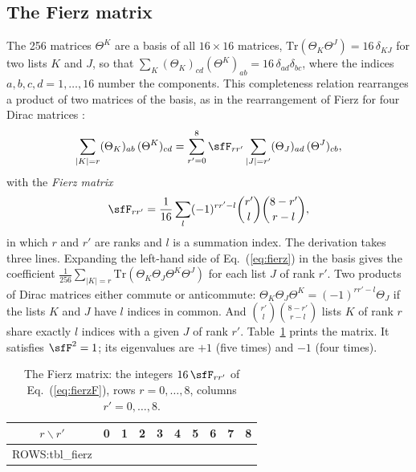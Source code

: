 \subsection{The Fierz matrix}

The 256 matrices $\Theta^{K}$ are a basis of all $16\times16$ matrices,
$\mathrm{Tr}(\Theta_K\Theta^{J})=16\,\delta_{KJ}$ for two lists $K$ and $J$, so that
$\sum_K(\Theta_K)_{cd}(\Theta^{K})_{ab}=16\,\delta_{ad}\delta_{bc}$, where the indices
$a,b,c,d=1,\dots,16$ number the components. This completeness relation rearranges a product of two
matrices of the basis, as in the rearrangement of Fierz for four Dirac matrices \cite{Fierz1937}:
\begin{equation}
\sum_{|K|=r}(\Theta_K)_{ab}\,(\Theta^{K})_{cd}=\sum_{r'=0}^{8}\sfF_{rr'}\sum_{|J|=r'}(\Theta_J)_{ad}\,(\Theta^{J})_{cb},
\label{eq:fierz}
\end{equation}
with the \emph{Fierz matrix}
\begin{equation}
\sfF_{rr'}=\frac1{16}\sum_{l}(-1)^{rr'-l}\binom{r'}{l}\binom{8-r'}{r-l} ,
\label{eq:fierzF}
\end{equation}
in which $r$ and $r'$ are ranks and $l$ is a summation index. The derivation takes three lines.
Expanding the left-hand side of Eq.~(\ref{eq:fierz}) in the basis gives the coefficient
$\tfrac1{256}\sum_{|K|=r}\mathrm{Tr}(\Theta_K\Theta_J\Theta^{K}\Theta^{J})$ for each list $J$ of rank
$r'$. Two products of Dirac matrices either commute or anticommute:
$\Theta_K\Theta_J\Theta^{K}=(-1)^{rr'-l}\Theta_J$ if the lists $K$ and $J$ have $l$ indices in common.
And $\binom{r'}{l}\binom{8-r'}{r-l}$ lists $K$ of rank $r$ share exactly $l$ indices with a given $J$
of rank $r'$. Table~\ref{tab:fierz} prints the matrix. It satisfies $\sfF^{2}=1$; its eigenvalues are
$+1$ (five times) and $-1$ (four times).

\begin{table}
\caption{\label{tab:fierz}The Fierz matrix: the integers $16\,\sfF_{rr'}$ of Eq.~(\ref{eq:fierzF}),
rows $r=0,\dots,8$, columns $r'=0,\dots,8$.}
\begin{ruledtabular}
\begin{tabular}{c|rrrrrrrrr}
$r\backslash r'$ & 0 & 1 & 2 & 3 & 4 & 5 & 6 & 7 & 8 \\
\hline
{{ROWS:tbl_fierz}}
\end{tabular}
\end{ruledtabular}
\end{table}

